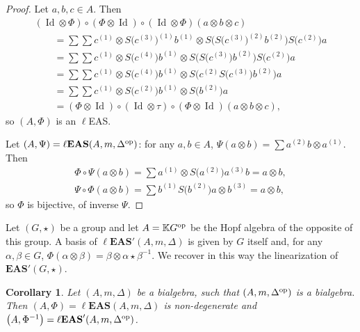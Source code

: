\documentclass[pdftex]{sigma}
\numberwithin{equation}{section}
\newtheorem{Corollary}[Theorem]{Corollary}
\newcommand{\eas}{\mathbf{EAS}}
\newcommand{\leas}{\ell\mathbf{EAS}}
\begin{document}
\begin{proof}
Let $a,b,c\in A$. Then
\begin{gather*}
(\operatorname{Id} \otimes \Phi)\circ(\Phi\otimes \operatorname{Id})\circ (\operatorname{Id} \otimes \Phi)(a\otimes b\otimes c)\\
\qquad=\sum \sum c^{(1)}\otimes S\bigl(c^{(3)}\bigr)^{(1)}b^{(1)}\otimes S\bigl(S\bigl(c^{(3)}\bigr)^{(2)}b^{(2)}\bigr)S\bigl(c^{(2)}\bigr)a\\
\qquad=\sum \sum c^{(1)}\otimes S\bigl(c^{(4)}\bigr)b^{(1)}\otimes S\bigl(S\bigl(c^{(3)}\bigr)b^{(2)}\bigr)S\bigl(c^{(2)}\bigr)a\\
\qquad=\sum \sum c^{(1)}\otimes S\bigl(c^{(4)}\bigr)b^{(1)}\otimes S\bigl(c^{(2)}S\bigl(c^{(3)}\bigr)b^{(2)}\bigr)a\\
\qquad=\sum \sum c^{(1)}\otimes S\bigl(c^{(2)}\bigr)b^{(1)}\otimes S\bigl(b^{(2)}\bigr)a\\
\qquad=(\Phi\otimes \operatorname{Id})\circ (\operatorname{Id} \otimes \tau)\circ (\Phi\otimes \operatorname{Id})(a\otimes b\otimes c),
\end{gather*}
so $(A,\Phi)$ is an $\ell$EAS.

Let $(A,\Psi)=\leas(A,m,\Delta^{\rm op})$: for any $a,b\in A$, $\Psi(a\otimes b)=\sum a^{(2)}b\otimes a^{(1)}$. Then
\begin{gather*}
\Phi\circ \Psi(a \otimes b)=\sum a^{(1)}\otimes S\bigl(a^{(2)}\bigr)a^{(3)}b=a\otimes b,\\
\Psi\circ \Phi(a\otimes b)=\sum b^{(1)}S\bigl(b^{(2)}\bigr)a\otimes b^{(3)}=a\otimes b,
\end{gather*}
so $\Phi$ is bijective, of inverse $\Psi$. \end{proof}

\begin{Example}
Let $(G,\star)$ be a group and let $A=\mathbb{K} G^{\rm op}$ be the Hopf algebra of the opposite of this group. A basis of $\leas'(A,m,\Delta)$ is given by $G$ itself and, for any $\alpha,\beta\in G$,
$\Phi(\alpha \otimes \beta)=\beta \otimes \alpha \star \beta^{-1}$.
We recover in this way the linearization of $\eas'(G,\star)$.
\end{Example}

\begin{Corollary}
Let $(A,m,\Delta)$ be a bialgebra, such that $(A,m,\Delta^{\rm op})$ is a bialgebra. Then $(A,\Phi)=\leas(A,m,\Delta)$ is non-degenerate and $\bigl(A,\Phi^{-1}\bigr)=\leas'(A,m,\Delta^{\rm op})$.
\end{Corollary}
\end{document}
